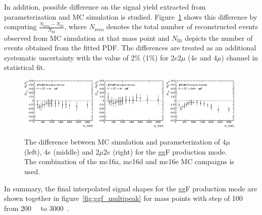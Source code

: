 In addition, possible difference on the signal yield extracted from parameterization and MC simulation is studied.
Figure~\ref{fig:ggf_graph_YieldCheckAll} shows this difference by computing $\frac{N_{\text{reco}}-N_{\text{fit}}}{N_{\text{fit}}}$, where $N_{\text{reco}}$ denotes the total number of reconstructed events observed from MC simulation at that mass point
and $N_{\text{fit}}$ depicts the number of events obtained from the fitted PDF.
The differences are treated as an additional systematic uncertainty with the value of 2\% (1\%) for 2$e$2$\mu$ (4$e$ and 4$\mu$) channel in statistical fit.

\begin{figure}[htbp]
    \centering
    \includegraphics[width=0.32\textwidth]{figures/HMHZZ/signal/NWA//ggf_graph_YieldCheck_4mu_fixed.eps}
    \includegraphics[width=0.32\textwidth]{figures/HMHZZ/signal/NWA//ggf_graph_YieldCheck_4e_fixed.eps}
    \includegraphics[width=0.32\textwidth]{figures/HMHZZ/signal/NWA//ggf_graph_YieldCheck_2mu2e_fixed.eps}
    \caption{The difference between MC simulation and parameterization of
    $4\mu$ (left), $4e$ (middle) and $2\mu 2e$ (right) for the ggF production
    mode. The combination of the mc16a, mc16d and mc16e MC campaigns is used.}
    \label{fig:ggf_graph_YieldCheckAll}
\end{figure}

In summary, the final interpolated signal shapes for the ggF production mode are shown together in figure~\ref{fig:ggf_multipeak} for mass points with step of 100~\gev~ from 200~\gev~ to 3000~\gev.

